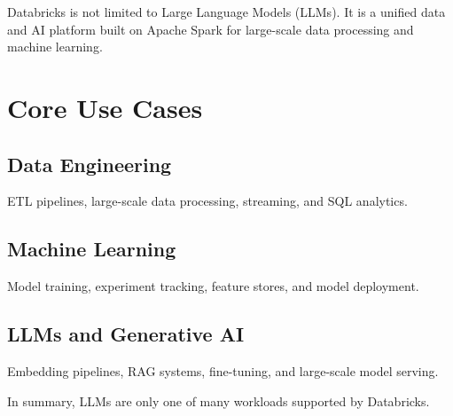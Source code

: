 \documentclass[a4paper]{article}
\title{}
\date{}
\begin{document}
    \maketitle
    Databricks is not limited to Large Language Models (LLMs). It is a unified data and AI platform built on Apache Spark for large-scale data processing and machine learning.
    
    
    \section{Core Use Cases}
        
        \subsection{Data Engineering}
            ETL pipelines, large-scale data processing, streaming, and SQL analytics.
        
        \subsection{Machine Learning}
            Model training, experiment tracking, feature stores, and model deployment.
        
        \subsection{LLMs and Generative AI}
            Embedding pipelines, RAG systems, fine-tuning, and large-scale model serving.
            
            In summary, LLMs are only one of many workloads supported by Databricks.
\end{document}
